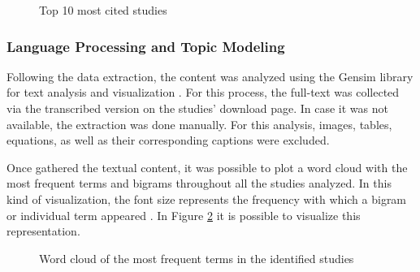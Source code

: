 \documentclass[conference]{IEEEtran}
\begin{document}
\begin{figure}[!htbp]
    \caption{\label{fig:references}Top 10 most cited studies}
\end{figure}

\subsubsection{Language Processing and Topic Modeling}

Following the data extraction, the content was analyzed using the Gensim library for text analysis and visualization \cite{rehurek_lrec}. For this process, the full-text was collected via the transcribed version on the studies' download page. In case it was not available, the extraction was done manually. For this analysis, images, tables, equations, as well as their corresponding captions were excluded.

Once gathered the textual content, it was possible to plot a word cloud with the most frequent terms and bigrams throughout all the studies analyzed. In this kind of visualization, the font size represents the frequency with which a bigram or individual term appeared \cite{Cui2010}. In Figure \ref{fig:wordcloud} it is possible to visualize this representation.

\begin{figure}[!htbp]
    \caption{\label{fig:wordcloud}Word cloud of the most frequent terms in the identified studies}
\end{figure}
\end{document}
